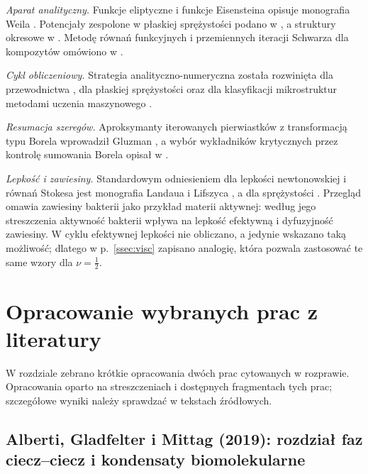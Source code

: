 \documentclass[12pt,a4paper,twoside,openright]{report}
\theoremstyle{definition}
\theoremstyle{remark}
\begin{document}
\emph{Aparat analityczny.} Funkcje eliptyczne i funkcje Eisensteina opisuje monografia Weila \cite{weil1999elliptic}. Potencjały zespolone w płaskiej sprężystości podano w \cite{muskhelishvili1953some}, a struktury okresowe w \cite{grigolyuk1992periodic}. Metodę równań funkcyjnych i przemiennych iteracji Schwarza dla kompozytów omówiono w \cite{drygas2019applied,mityushev2022effective1}.

\emph{Cykl obliczeniowy.} Strategia analityczno-numeryczna została rozwinięta dla przewodnictwa \cite{mityushev2025computational}, dla płaskiej sprężystości \cite{czapla2025computational} oraz dla klasyfikacji mikrostruktur metodami uczenia maszynowego \cite{mityushev2025computationalpart3}.

\emph{Resumacja szeregów.} Aproksymanty iterowanych pierwiastków z transformacją typu Borela wprowadził Gluzman \cite{gluzman2022iterative}, a wybór wykładników krytycznych przez kontrolę sumowania Borela opisał w \cite{Gluzman2024CriticalIndices}.

\emph{Lepkość i zawiesiny.} Standardowym odniesieniem dla lepkości newtonowskiej i równań Stokesa jest monografia Landaua i Lifszyca \cite{landau1987fluid}, a dla sprężystości \cite{landau1986theory}. Przegląd \cite{aranson2022bacterial} omawia zawiesiny bakterii jako przykład materii aktywnej: według jego streszczenia aktywność bakterii wpływa na lepkość efektywną i dyfuzyjność zawiesiny. W cyklu \cite{mityushev2025computational,czapla2025computational,mityushev2025computationalpart3} efektywnej lepkości nie obliczano, a jedynie wskazano taką możliwość; dlatego w p.~\ref{ssec:visc} zapisano analogię, która pozwala zastosować te same wzory dla $\nu=\tfrac12$.


\chapter{Opracowanie wybranych prac z literatury}\label{sec:opracowania}

W rozdziale zebrano krótkie opracowania dwóch prac cytowanych w rozprawie. Opracowania oparto na streszczeniach i dostępnych fragmentach tych prac; szczegółowe wyniki należy sprawdzać w tekstach źródłowych.

\section{Alberti, Gladfelter i Mittag (2019): rozdział faz ciecz--ciecz i kondensaty biomolekularne}\label{ssec:alberti}
\end{document}
